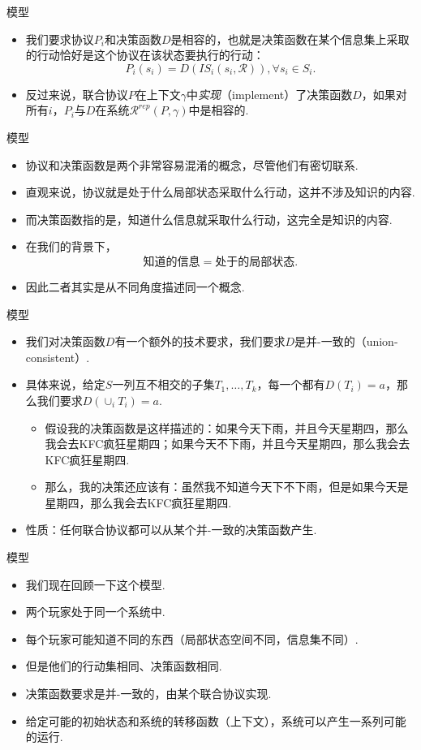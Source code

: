 {模型}
\begin{itemize}
    \item 我们要求协议$P_i$和决策函数$D$是相容的，也就是决策函数在某个信息集上采取的行动恰好是这个协议在该状态要执行的行动：
    \[P_i(s_i)=D(IS_i(s_i,\mathcal R)),\forall s_i\in S_i.\]
    \item 反过来说，联合协议$P$在上下文$\gamma$中\emph{实现}（implement）了决策函数$D$，如果对所有$i$，$P_i$与$D$在系统$\mathcal R^{rep}(P,\gamma)$中是相容的.
\end{itemize}


{模型}
\begin{itemize}
    \item 协议和决策函数是两个非常容易混淆的概念，尽管他们有密切联系.
    \item 直观来说，协议就是处于什么局部状态采取什么行动，这并不涉及知识的内容.
    \item 而决策函数指的是，知道什么信息就采取什么行动，这完全是知识的内容.
    \item 在我们的背景下，
    \[\text{知道的信息}=\text{处于的局部状态}.\]
    \item 因此二者其实是从不同角度描述同一个概念.
\end{itemize}


{模型}
\begin{itemize}
    \item 我们对决策函数$D$有一个额外的技术要求，我们要求$D$是并-一致的（union-consistent）.
    \item 具体来说，给定$S$一列互不相交的子集$T_1,\dots,T_k$，每一个都有$D(T_i)=a$，那么我们要求$D(\cup_i T_i)=a$.
    \begin{itemize}
        \item 假设我的决策函数是这样描述的：如果今天下雨，并且今天星期四，那么我会去KFC疯狂星期四；如果今天不下雨，并且今天星期四，那么我会去KFC疯狂星期四.
        \item 那么，我的决策还应该有：虽然我不知道今天下不下雨，但是如果今天是星期四，那么我会去KFC疯狂星期四.
    \end{itemize}
    \item 性质：任何联合协议都可以从某个并-一致的决策函数产生.
\end{itemize}


{模型}
\begin{itemize}
    \item 我们现在回顾一下这个模型.
    \item 两个玩家处于同一个系统中.
    \item 每个玩家可能知道不同的东西（局部状态空间不同，信息集不同）.
    \item 但是他们的行动集相同、决策函数相同.
    \item 决策函数要求是并-一致的，由某个联合协议实现.
    \item 给定可能的初始状态和系统的转移函数（上下文），系统可以产生一系列可能的运行.
\end{itemize}


